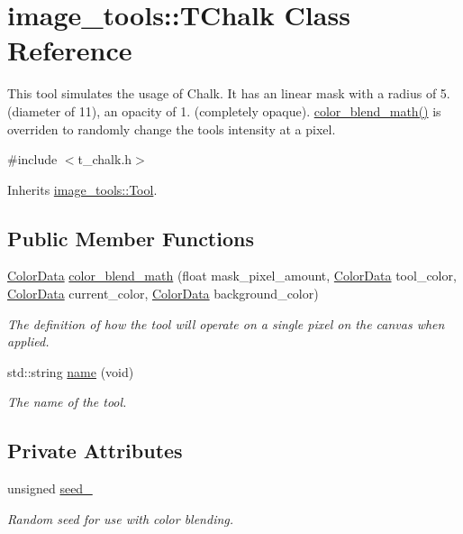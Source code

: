 \hypertarget{classimage__tools_1_1TChalk}{}\section{image\+\_\+tools\+:\+:T\+Chalk Class Reference}
\label{classimage__tools_1_1TChalk}


This tool simulates the usage of Chalk. It has an linear mask with a radius of 5. (diameter of 11), an opacity of 1. (completely opaque). \hyperlink{classimage__tools_1_1TChalk_a3cda7adc97a776c6575452f9d983eff5}{color\+\_\+blend\+\_\+math()} is overriden to randomly change the tool\textquotesingle{}s intensity at a pixel.  




{\ttfamily \#include $<$t\+\_\+chalk.\+h$>$}



Inherits \hyperlink{classimage__tools_1_1Tool}{image\+\_\+tools\+::\+Tool}.

\subsection*{Public Member Functions}
\begin{DoxyCompactItemize}
\item 
\hyperlink{classimage__tools_1_1ColorData}{Color\+Data} \hyperlink{classimage__tools_1_1TChalk_a3cda7adc97a776c6575452f9d983eff5}{color\+\_\+blend\+\_\+math} (float mask\+\_\+pixel\+\_\+amount, \hyperlink{classimage__tools_1_1ColorData}{Color\+Data} tool\+\_\+color, \hyperlink{classimage__tools_1_1ColorData}{Color\+Data} current\+\_\+color, \hyperlink{classimage__tools_1_1ColorData}{Color\+Data} background\+\_\+color)
\begin{DoxyCompactList}\small\item\em The definition of how the tool will operate on a single pixel on the canvas when applied. \end{DoxyCompactList}\item 
std\+::string \hyperlink{classimage__tools_1_1TChalk_a74f65065dbc618e5f30089597d39bb46}{name} (void)
\begin{DoxyCompactList}\small\item\em The name of the tool. \end{DoxyCompactList}\end{DoxyCompactItemize}
\subsection*{Private Attributes}
\begin{DoxyCompactItemize}
\item 
unsigned \hyperlink{classimage__tools_1_1TChalk_a918945c12f8ff800a5c78b16951055d0}{seed\+\_\+}\hypertarget{classimage__tools_1_1TChalk_a918945c12f8ff800a5c78b16951055d0}{}\label{classimage__tools_1_1TChalk_a918945c12f8ff800a5c78b16951055d0}

\begin{DoxyCompactList}\small\item\em Random seed for use with color blending. \end{DoxyCompactList}\end{DoxyCompactItemize}
